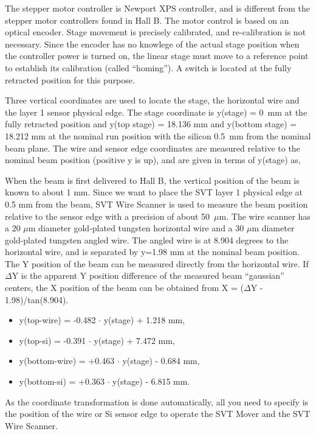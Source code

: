 \documentclass[12pt]{report}
\begin{document}
The stepper motor controller is Newport XPS controller, and is different from the stepper motor controllers found in Hall B. The motor control is based on an optical encoder. Stage movement is precisely calibrated, and re-calibration is not necessary. Since the encoder has no knowlege of the actual stage position when the controller power is turned on, the linear stage must move to a reference point to establish its calibration (called ``homing''). A switch is located at the fully retracted position for this purpose. 

Three vertical coordinates are used to locate the stage, the horizontal wire and the layer 1 sensor physical edge. The stage coordinate is y(stage) = 0~mm at the fully retracted position and y(top stage) = 18.136 mm  and y(bottom stage) = 18.212 mm at the nominal run position with the silicon 0.5~mm from the nominal beam plane. The wire and sensor edge coordinates are measured relative to the nominal beam position (positive y is up), and are given in terms of y(stage) as,

When the beam is first delivered to Hall B, the vertical position of the beam is known to about 1 mm. Since we want to place the SVT layer 1 physical edge at 0.5 mm from the beam, SVT Wire Scanner is used to measure the beam position relative to the sensor edge with a precision of about 50~$\mu$m. The wire scanner has a 20 $\mu$m diameter gold-plated tungsten horizontal wire and a 30 $\mu$m diameter gold-plated tungsten angled wire. The angled wire is at 8.904 degrees to the horizontal wire, and is separated by y=1.98 mm at the nominal beam position. The Y position of the beam can be measured directly from the horizontal wire. If $\Delta$Y is the apparent Y position difference of the measured beam ``gaussian'' centers, the X position of the beam can be obtained from X = ($\Delta$Y - 1.98)/tan(8.904).   

\begin{itemize}
\item
y(top-wire) = -0.482 $\cdot$ y(stage) + 1.218 mm,
\item
y(top-si) = -0.391 $\cdot$ y(stage) + 7.472 mm,
\item
y(bottom-wire) = +0.463 $\cdot$ y(stage) - 0.684 mm,
\item
y(bottom-si) = +0.363 $\cdot$ y(stage) - 6.815 mm.
\end{itemize}

As the coordinate transformation is done automatically, all you need to specify is the position of the wire or Si sensor edge to operate the SVT Mover and the SVT Wire Scanner. 
\end{document}
